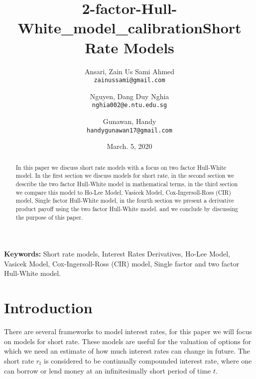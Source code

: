 \documentclass[11pt]{article}
\title{2-factor-Hull-White\_model\_calibration}
\begin{document}
\nocite{*} %

\title{Short Rate Models}

\author{
  Ansari, Zain Us Sami Ahmed\\
  \texttt{zainussami@gmail.com}
  \and
  Nguyen, Dang Duy Nghia \\
  \texttt{nghia002@e.ntu.edu.sg}
   \and
  Gunawan, Handy \\
  \texttt{handygunawan17@gmail.com}  
  }

\date{March. 5, 2020} %

\maketitle

\noindent
\textbf{Keywords:} Short rate models, Interest Rates Derivatives,  Ho-Lee Model, Vasicek Model, Cox-Ingersoll-Ross (CIR) model, Single factor and two factor Hull-White model.



\begin{abstract}
In this paper we discuss short rate models with a focus on two factor Hull-White model.  In the first section we discuss models for short rate, in the second section we describe the two factor Hull-White model in mathematical terms, in the third section we compare this model to Ho-Lee Model, Vasicek Model, Cox-Ingersoll-Ross (CIR) model, Single factor Hull-White model,  in the fourth section we present a derivative product payoff using the two factor Hull-White model. and we conclude by discussing the purpose of this paper.  
\end{abstract}

\section{Introduction
}
There are several frameworks to model interest rates, for this paper we will focus on models for short rate.  These models are useful for the valuation of options for which we need an estimate of how much interest rates can change in future.  The short rate $r_t$ is considered to be continually compounded interest rate, where one can borrow or lend money at an infinitesimally short period of time $t$. \\
\end{document}
